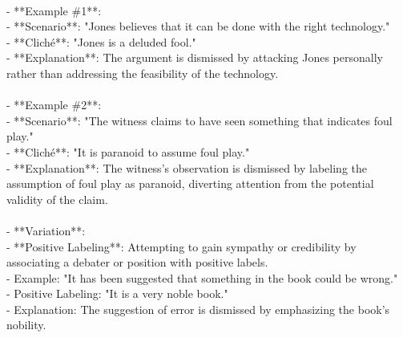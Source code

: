\documentclass[a4paper,12pt,single,pdftex]{scrartcl}
\begin{document}
    
      
    \\

    
      - **Example \#1**:
    \\

    
        - **Scenario**: "Jones believes that it can be done with the right technology."
    \\

    
        - **Cliché**: "Jones is a deluded fool."
    \\

    
        - **Explanation**: The argument is dismissed by attacking Jones personally rather than addressing the feasibility of the technology.
    \\

    
      
    \\

    
      - **Example \#2**:
    \\

    
        - **Scenario**: "The witness claims to have seen something that indicates foul play."
    \\

    
        - **Cliché**: "It is paranoid to assume foul play."
    \\

    
        - **Explanation**: The witness's observation is dismissed by labeling the assumption of foul play as paranoid, diverting attention from the potential validity of the claim.
    \\

    
      
    \\

    
      - **Variation**:
    \\

    
        - **Positive Labeling**: Attempting to gain sympathy or credibility by associating a debater or position with positive labels.
    \\

    
          - Example: "It has been suggested that something in the book could be wrong."
    \\

    
          - Positive Labeling: "It is a very noble book."
    \\

    
          - Explanation: The suggestion of error is dismissed by emphasizing the book's nobility.
    \\
\end{document}
